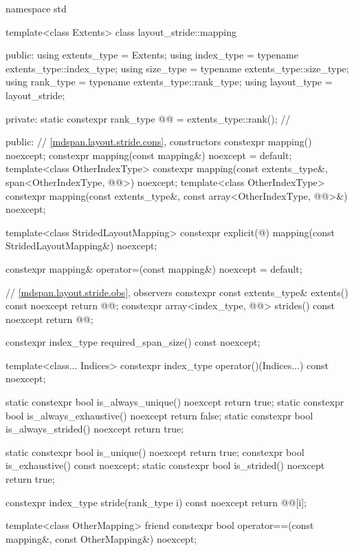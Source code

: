 \begin{codeblock}
namespace std {
  template<class Extents>
  class layout_stride::mapping {
  public:
    using extents_type = Extents;
    using index_type = typename extents_type::index_type;
    using size_type = typename extents_type::size_type;
    using rank_type = typename extents_type::rank_type;
    using layout_type = layout_stride;

  private:
    static constexpr rank_type @@ = extents_type::rank();    // \expos

  public:
    // \ref{mdspan.layout.stride.cons}, constructors
    constexpr mapping() noexcept;
    constexpr mapping(const mapping&) noexcept = default;
    template<class OtherIndexType>
      constexpr mapping(const extents_type&, span<OtherIndexType, @@>) noexcept;
    template<class OtherIndexType>
      constexpr mapping(const extents_type&, const array<OtherIndexType, @@>&) noexcept;

    template<class StridedLayoutMapping>
      constexpr explicit(@\seebelow@) mapping(const StridedLayoutMapping&) noexcept;

    constexpr mapping& operator=(const mapping&) noexcept = default;

    // \ref{mdspan.layout.stride.obs}, observers
    constexpr const extents_type& extents() const noexcept { return @@; }
    constexpr array<index_type, @@> strides() const noexcept { return @@; }

    constexpr index_type required_span_size() const noexcept;

    template<class... Indices>
      constexpr index_type operator()(Indices...) const noexcept;

    static constexpr bool is_always_unique() noexcept { return true; }
    static constexpr bool is_always_exhaustive() noexcept { return false; }
    static constexpr bool is_always_strided() noexcept { return true; }

    static constexpr bool is_unique() noexcept { return true; }
    constexpr bool is_exhaustive() const noexcept;
    static constexpr bool is_strided() noexcept { return true; }

    constexpr index_type stride(rank_type i) const noexcept { return @@[i]; }

    template<class OtherMapping>
      friend constexpr bool operator==(const mapping&, const OtherMapping&) noexcept;

}}
\end{codeblock}
